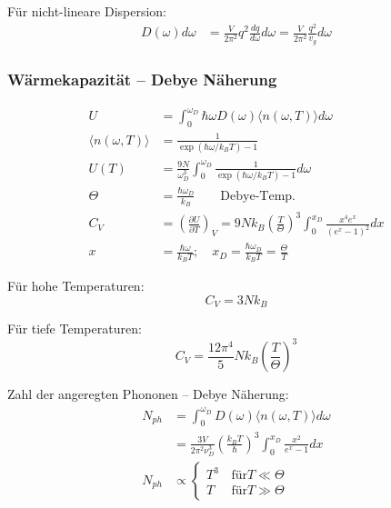 \pagebreak
Für nicht-lineare Dispersion:
\begin{equation*}
    \begin{aligned}
        D(\omega)d \omega &= \frac{V}{2 \pi^2} q^2 \frac{dq}{d\omega} d\omega = \frac{V}{2 \pi^2} \frac{q^2}{v_g} d\omega
    \end{aligned}
\end{equation*}

\subsubsection*{Wärmekapazität – Debye Näherung}
\begin{equation*}
    \begin{aligned}
        U &= \int_0^{\omega_D} \hbar \omega D(\omega) \langle n(\omega, T) \rangle d\omega \\
        \langle n(\omega,T) \rangle &= \frac{1}{\exp(\hbar \omega / k_B T) -1} \\
        U(T) &= \frac{9N}{\omega_D^3} \int_0^{\omega_D} \frac{1}{\exp(\hbar \omega / k_B T) -1} d\omega \\
        \Theta &= \frac{\hbar \omega_D}{k_B} \qquad \text{Debye-Temp.} \\
        C_V &= \left(\frac{\partial U}{\partial T}\right)_V = 9Nk_B \left(\frac{T}{\Theta}\right)^3 \int_0^{x_D} \frac{x^4 e^x}{(e^x -1)^2} dx \\
        x &= \frac{\hbar \omega}{k_B T}; \quad x_D = \frac{\hbar \omega_D}{k_B T} = \frac{\Theta}{T}
    \end{aligned}
\end{equation*}

Für hohe Temperaturen: 
\begin{equation*}
    C_V = 3N k_B
\end{equation*}

Für tiefe Temperaturen:
\begin{equation*}
    C_V = \frac{12 \pi^4}{5} N k_B \left(\frac{T}{\Theta}\right)^3
\end{equation*}

Zahl der angeregten Phononen – Debye Näherung:
\begin{equation*}
    \begin{aligned}
        N_{ph} &= \int_0^{\omega_D} D(\omega) \langle n (\omega,T) \rangle d\omega \\ 
        &= \frac{3V}{2 \pi^2 \nu_D^3} \left(\frac{k_B T}{\hbar}\right)^3 \int_0^{x_D} \frac{x^2}{e^x -1}dx \\
        N_{ph} &\propto \begin{cases}
            T^3 & \, \text{für} T \ll \Theta \\
            T &  \, \text{für} T \gg \Theta
            \end{cases} \\
    \end{aligned}
\end{equation*}

